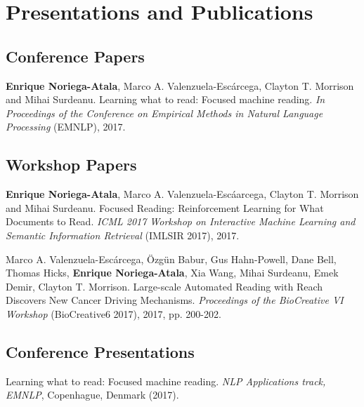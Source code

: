 \documentclass[letterpaper]{article}
\renewenvironment{itemize}{
  \begin{list}{}{
    \setlength{\leftmargin}{1.5em}
  }
}{
  \end{list}
}
\begin{document}
\section*{Presentations and Publications}


\subsection*{Conference Papers}

\begin{itemize}
\item \textbf{Enrique Noriega-Atala}, Marco A. Valenzuela-Esc\'{a}rcega, Clayton T. Morrison and Mihai Surdeanu. Learning what to read: Focused machine reading. \textit{In Proceedings of the Conference on Empirical Methods in Natural Language Processing} (EMNLP), 2017.
\end{itemize}

\subsection*{Workshop Papers}
\begin{itemize}
	\item \textbf{Enrique Noriega-Atala}, Marco A. Valenzuela-Esc\'a{a}rcega, Clayton T. Morrison and Mihai Surdeanu. Focused Reading: Reinforcement Learning for What Documents to Read. \textit{ICML 2017 Workshop on Interactive Machine Learning and Semantic Information Retrieval} (IMLSIR 2017), 2017.
	\item Marco A. Valenzuela-Esc\'{a}rcega, \"{O}zg\"{u}n Babur, Gus Hahn-Powell, Dane Bell, Thomas Hicks, \textbf{Enrique Noriega-Atala}, Xia Wang, Mihai Surdeanu, Emek Demir, Clayton T. Morrison. Large-scale Automated Reading with Reach Discovers New Cancer Driving Mechanisms. \textit{Proceedings of the BioCreative VI Workshop} (BioCreative6 2017), 2017, pp. 200-202.
\end{itemize}

\subsection*{Conference Presentations}

\begin{itemize}
	
\item Learning what to read: Focused machine reading. \textit{NLP Applications track, EMNLP}, Copenhague, Denmark (2017).
\end{itemize}
\end{document}
